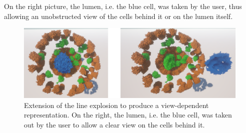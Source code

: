 On the right picture, the lumen, i.e. the blue cell, was taken by the user, thus allowing an unobstructed view of the cells behind it or on the lumen itself.  
\begin{figure}[h]
	\centering
	\includegraphics[width=1\linewidth]{fig/Images/HeadMountedLineExplosion}
	\caption[]{Extension of the line explosion to produce a view-dependent representation. On the right, the lumen, i.e. the blue cell, was taken out by the user to allow a clear view on the cells behind it.  }
	\label{fig:HeadMountedLineExplosion}
\end{figure}

